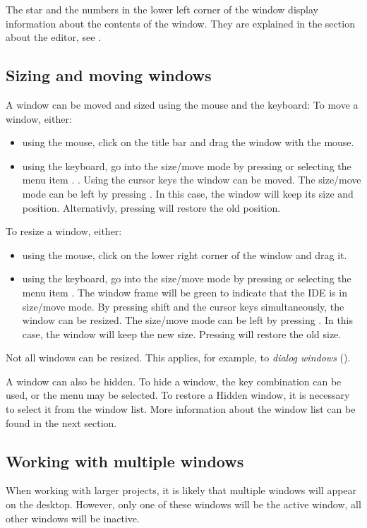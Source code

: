 The star and the numbers in the lower left corner of the window
display information about the contents of the window. They
are explained in the section about the editor, see .

%
%
\subsection{Sizing and moving windows}
\label{se:windowsizingmoving}
A window can be moved and sized using the mouse and the keyboard:
To move a window, either:
\begin{itemize}
\item using the mouse, click on the title bar and drag the window 
with the mouse.
\item using the keyboard, go into the size/move mode
by pressing  or selecting the menu item
. . Using the cursor keys the window can be moved. 
The size/move mode can be left by pressing . 
In this case, the window will keep its size and position. 
Alternativly, pressing  will restore the old position.
\end{itemize} 
To resize a window, either:
\begin{itemize}
\item using the mouse, click on the lower right corner of the window
and drag it.
\item using the keyboard, go into the size/move mode
by pressing  or selecting the menu item
. The window frame will be green to indicate that
the IDE is in size/move mode. 
By pressing shift and the cursor keys simultaneously, the window can 
be resized.  The size/move mode can be left by pressing
. In this case, the window will keep the new size.
Pressing  will restore the old size.
\end{itemize}
Not all windows can be resized. This applies, for example, to
\emph{dialog windows} ().

A window can also be hidden. To hide a window, the  key
combination can be used, or the  menu may be selected.
To restore a Hidden window, it is necessary to select it from the window
list. More information about the window list can be found in the next
section.   
%
%
\subsection{Working with multiple windows}
\label{se:multiplewindows}
When working with larger projects, it is likely that multiple windows 
will appear on the desktop. However, only one of these windows will be 
the active window, all other windows will be inactive.

